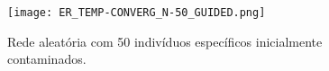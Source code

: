 \documentclass{article}
\begin{document}
\begin{figure}[H]
  \centerline{\texttt{[image: ER\_TEMP-CONVERG\_N-50\_GUIDED.png]}}
  \caption{Rede aleatória com 50 indivíduos específicos inicialmente contaminados.}
  \label{fig:boat1}
\end{figure}










\clearpage
 
\end{document}
